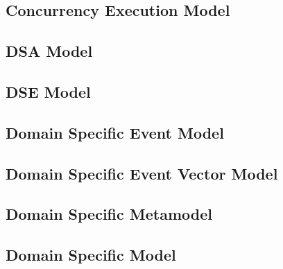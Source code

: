\documentclass{gemoc} %
\begin{document}
\subsection{Concurrency Execution Model}
\label{sec:Concurrency_Execution_Model}


\subsection{DSA Model}
\label{sec:DSA_Model}


\subsection{DSE Model}
\label{sec:DSE_Model}


\subsection{Domain Specific Event Model}
\label{sec:Domain_Specific_Event_Model}


\subsection{Domain Specific Event Vector Model}
\label{sec:Domain_Specific_Event_Vector_Model}


\subsection{Domain Specific Metamodel}
\label{sec:Domain_Specific_Metamodel}


\subsection{Domain Specific Model}
\label{sec:Domain_Specific_Model}
\end{document}
